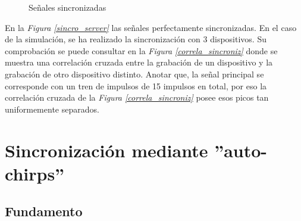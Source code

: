 \documentclass[a4paper,11pt]{book}
\begin{document}
\begin{figure}
 \centering
 \caption{Señales sincronizadas}
\end{figure}



En la \textit{Figura \ref{sincro_server}} las señales perfectamente sincronizadas. En el caso de la simulación, se ha realizado la sincronización con 3 dispositivos. Su comprobación se puede consultar en la \textit{Figura \ref{correla_sincroniz}} donde se muestra una correlación cruzada entre la grabación de un dispositivo y la grabación de otro dispositivo distinto. Anotar que, la señal principal se corresponde con un tren de impulsos de 15 impulsos en total, por eso la correlación cruzada de la \textit{Figura \ref{correla_sincroniz}} posee esos picos tan uniformemente separados.



\section{Sincronización mediante ''auto-chirps''}

\subsection{Fundamento}
\end{document}
